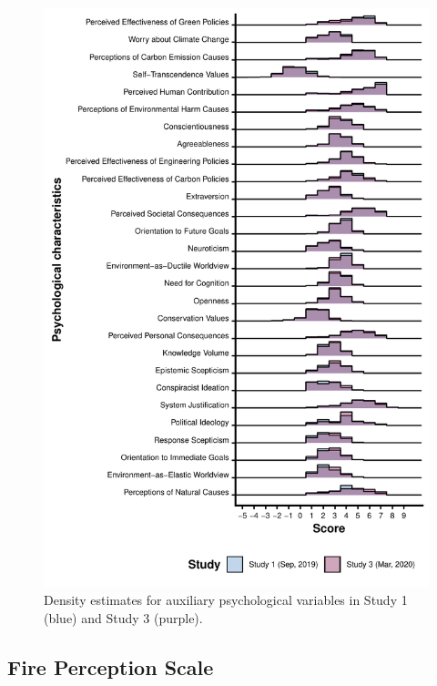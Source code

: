 \documentclass[
  letterpaper,
  DIV=11,
  numbers=noendperiod]{scrartcl}
\begin{document}
\begin{figure}

{\centering \includegraphics{supplement_files/figure-pdf/fig-scale-change-1.pdf}

}

\caption{\label{fig-scale-change}Density estimates for auxiliary
psychological variables in Study 1 (blue) and Study 3 (purple).}

\end{figure}

\clearpage

\hypertarget{fire-perception-scale}{%
\subsection{Fire Perception Scale}\label{fire-perception-scale}}
\end{document}
